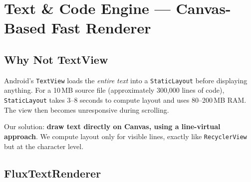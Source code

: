 \documentclass[12pt,a4paper]{report}
\newcommand{\PB}{\newpage}
\begin{document}
\PB

\chapter{Text \& Code Engine — Canvas-Based Fast Renderer}

\section{Why Not TextView}

Android's \texttt{TextView} loads the \emph{entire text} into a
\texttt{StaticLayout} before displaying anything. For a 10\,MB source file
(approximately 300,000 lines of code), \texttt{StaticLayout} takes 3--8
seconds to compute layout and uses 80--200\,MB RAM. The view then
becomes unresponsive during scrolling.

Our solution: \textbf{draw text directly on Canvas, using a line-virtual
approach}. We compute layout only for visible lines, exactly like
\texttt{RecyclerView} but at the character level.

\section{FluxTextRenderer}
\end{document}
